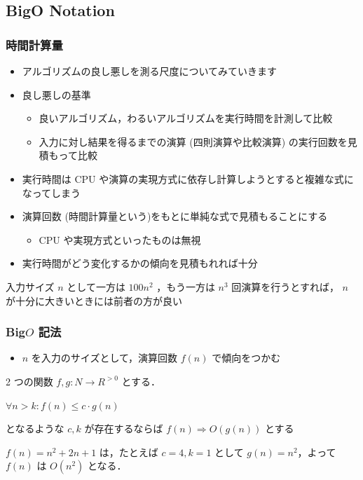 \subsection{Big\textendash O Notation}
\begin{frame}[shrink]
\frametitle{時間計算量}
  \begin{itemize}
\item アルゴリズムの良し悪しを測る尺度についてみていきます
\item 良し悪しの基準
    \begin{itemize}
\item 良いアルゴリズム，わるいアルゴリズムを実行時間を計測して比較
\item 入力に対し結果を得るまでの演算 (四則演算や比較演算) の実行回数を見積もって比較
    \end{itemize}
\item 実行時間は CPU や演算の実現方式に依存し計算しようとすると複雑な式になってしまう
\item 演算回数 (時間計算量という)をもとに単純な式で見積もることにする
    \begin{itemize}
\item CPU や実現方式といったものは無視
    \end{itemize}
\item 実行時間がどう変化するかの傾向を見積もれれば十分
  \end{itemize}
  \begin{example}
入力サイズ $n$ として一方は \(100n^2\) ，もう一方は \(n^3\) 回演算を行うとすれば，
 $n$ が十分に大きいときには前者の方が良い
  \end{example}
\end{frame}
\begin{frame}[shrink]
\frametitle{Big\textendash$O$ 記法}
  \begin{itemize}
\item $n$ を入力のサイズとして，演算回数 \(f(n)\) で傾向をつかむ
  \end{itemize}
  \begin{definition}
2 つの関数 \(f, g\colon N\rightarrow R^{>0}\) とする．
    \begin{center}
\(\forall n>k\colon f(n)\leq c\cdot g(n)\)
    \end{center}
となるような \(c, k\) が存在するならば \(f(n)\Rightarrow O(g(n))\) とする
  \end{definition}
  \begin{example}
\(f(n)=n^2+2n+1\) は，たとえば \(c=4, k=1\) として \(g(n)=n^2\)，よって \(f(n)\) は \(O(n^2)\) となる．
  \end{example}
\end{frame}
